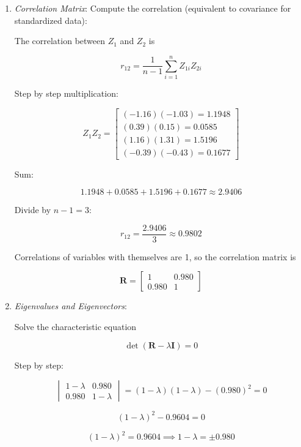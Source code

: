 \begin{enumerate}
    Total variance of standardized variables: $1+1=2$.

    \item \textit{Correlation Matrix}: Compute the correlation (equivalent to covariance for standardized data):
    
    The correlation between $Z_1$ and $Z_2$ is
    
    \[
    r_{12} = \frac{1}{n-1} \sum_{i=1}^{n} Z_{1i} Z_{2i}
    \]
    
    Step by step multiplication:
    
    \[
    Z_1 Z_2 =
    \begin{bmatrix}
    (-1.16)(-1.03) = 1.1948 \\
    (0.39)(0.15) = 0.0585 \\
    (1.16)(1.31) = 1.5196 \\
    (-0.39)(-0.43) = 0.1677
    \end{bmatrix}
    \]
    
    Sum:
    
    \[
    1.1948 + 0.0585 + 1.5196 + 0.1677 \approx 2.9406
    \]
    
    Divide by $n-1 = 3$:
    
    \[
    r_{12} = \frac{2.9406}{3} \approx 0.9802
    \]
    
    Correlations of variables with themselves are 1, so the correlation matrix is
    
    \[
    \mathbf{R} =
    \begin{bmatrix}
    1 & 0.980 \\
    0.980 & 1
    \end{bmatrix}
    \]
    
    \item \textit{Eigenvalues and Eigenvectors}:
    
    Solve the characteristic equation
    
    \[
    \det(\mathbf{R} - \lambda \mathbf{I}) = 0
    \]
    
    Step by step:
    
    \[
    \begin{vmatrix}
    1-\lambda & 0.980 \\
    0.980 & 1-\lambda
    \end{vmatrix} = (1-\lambda)(1-\lambda) - (0.980)^2 = 0
    \]
    
    \[
    (1-\lambda)^2 - 0.9604 = 0
    \]
    
    \[
    (1-\lambda)^2 = 0.9604 \implies 1-\lambda = \pm 0.980
    \]
    

\end{enumerate}
